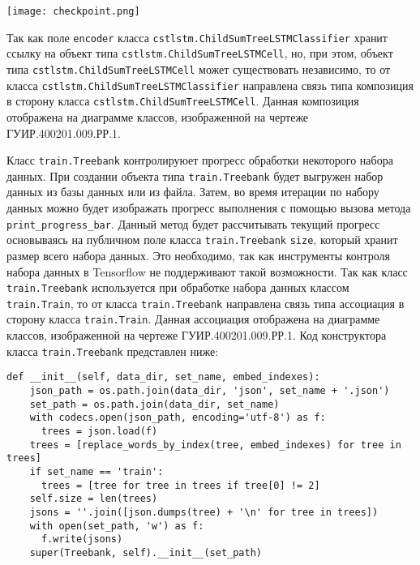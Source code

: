 \begin{center}
  \texttt{[image: checkpoint.png]}
  \label{fig:func:checkpoint}
\end{center}

Так как поле \texttt{encoder} класса \texttt{cstlstm.ChildSumTreeLSTMClassifier} хранит ссылку на объект типа \texttt{cstlstm.ChildSumTreeLSTMCell}, но, при этом, объект типа \texttt{cstlstm.ChildSumTreeLSTMCell} может существовать независимо, то от класса \texttt{cstlstm.ChildSumTreeLSTMClassifier} направлена связь типа композиция в сторону класса \texttt{cstlstm.ChildSumTreeLSTMCell}. Данная композиция отображена на диаграмме классов, изображенной на чертеже ГУИР.400201.009.РР.1.

Класс \texttt{train.Treebank} контролируюет прогресс обработки некоторого набора данных. При создании объекта типа \texttt{train.Treebank} будет выгружен набор данных из базы данных или из файла. Затем, во время итерации по набору данных можно будет изображать прогресс выполнения с помощью вызова метода \texttt{print\_progress\_bar}. Данный метод будет рассчитывать текущий прогресс основываясь на публичном поле класса \texttt{train.Treebank} \texttt{size}, который хранит размер всего набора данных. Это необходимо, так как инструменты контроля набора данных в Tensorflow не поддерживают такой возможности. Так как класс \texttt{train.Treebank} используется при обработке набора данных классом \texttt{train.Train}, то от класса \texttt{train.Treebank} направлена связь типа ассоциация в сторону класса \texttt{train.Train}. Данная ассоциация отображена на диаграмме классов, изображенной на чертеже ГУИР.400201.009.РР.1. Код конструктора класса \texttt{train.Treebank} представлен ниже:
\medskip
\begin{lstlisting}[style=Python]
  def __init__(self, data_dir, set_name, embed_indexes):
    json_path = os.path.join(data_dir, 'json', set_name + '.json')
    set_path = os.path.join(data_dir, set_name)
    with codecs.open(json_path, encoding='utf-8') as f:
      trees = json.load(f)
    trees = [replace_words_by_index(tree, embed_indexes) for tree in trees]
    if set_name == 'train':
      trees = [tree for tree in trees if tree[0] != 2]
    self.size = len(trees)
    jsons = ''.join([json.dumps(tree) + '\n' for tree in trees])
    with open(set_path, 'w') as f:
      f.write(jsons)
    super(Treebank, self).__init__(set_path)
\end{lstlisting}
\medskip

